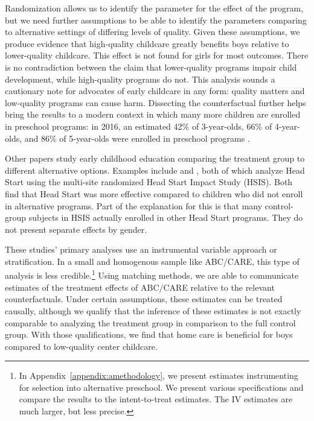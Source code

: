 Randomization allows us to identify the parameter for the effect of the program, but we need further assumptions to be able to identify the parameters comparing to alternative settings of differing levels of quality. Given these assumptions, we produce evidence that high-quality childcare greatly benefits boys relative to lower-quality childcare. This effect is not found for girls for most outcomes. There is no contradiction between the claim that lower-quality programs impair child development, while high-quality programs do not. This analysis sounds a cautionary note for advocates of early childcare in any form: quality matters and low-quality programs can cause harm. Dissecting the counterfactual further helps bring the results to a modern context in which many more children are enrolled in preschool programs: in 2016, an estimated 42\% of 3-year-olds, 66\% of 4-year-olds, and 86\% of 5-year-olds were enrolled in preschool programs \citep{NCES_2017_Education_IES}.

Other papers study early childhood education comparing the treatment group to different alternative options. Examples include \citet{Feller_Grindal_etal_2016_ComparedtoWhat} and \citet{Kline_Walters_2016_QJE}, both of which analyze Head Start using the multi-site randomized Head Start Impact Study (HSIS). Both find that Head Start was more effective compared to children who did not enroll in alternative programs. Part of the explanation for this is that many control-group subjects in HSIS actually enrolled in other Head Start programs. They do not present separate effects by gender. 

These studies' primary analyses use an instrumental variable approach or stratification. In a small and homogenous sample like ABC/CARE, this type of analysis is less credible.\footnote{In Appendix~\ref{appendix:amethodology}, we present estimates instrumenting for selection into alternative preschool. We present various specifications and compare the results to the intent-to-treat estimates. The IV estimates are much larger, but less precise.} Using matching methods, we are able to communicate estimates of the treatment effects of ABC/CARE relative to the relevant counterfactuals. Under certain assumptions, these estimates can be treated causally, although we qualify that the inference of these estimates is not exactly comparable to analyzing the treatment group in comparison to the full control group. With those qualifications, we find that home care is beneficial for boys compared to low-quality center childcare. 

